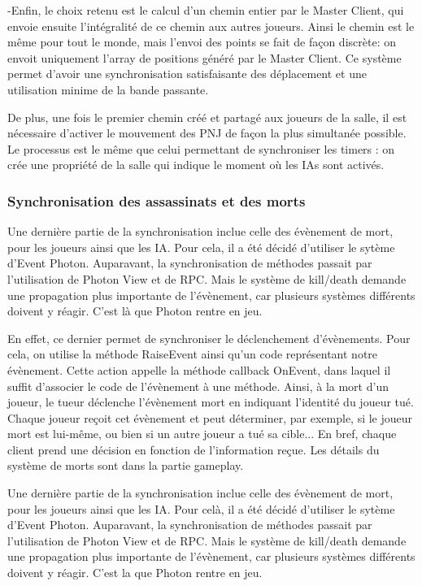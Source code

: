             -Enfin, le choix retenu est le calcul d'un chemin entier par le Master Client, qui envoie ensuite l'intégralité de ce chemin aux autres joueurs.
            Ainsi le chemin est le même pour tout le monde, mais l'envoi des points se fait de façon discrète: on envoit uniquement l'array de positions généré
            par le Master Client. Ce système permet d'avoir une synchronisation satisfaisante des déplacement et une utilisation minime de la bande passante.

        De plus, une fois le premier chemin créé et partagé aux joueurs de la salle, il est nécessaire d'activer le mouvement des PNJ de façon la plus simultanée possible.
        Le processus est le même que celui permettant de synchroniser les timers : on crée une propriété de la salle qui indique le moment où
        les IAs sont activés.

    \subsubsection{Synchronisation des assassinats et des morts}

        Une dernière partie de la synchronisation inclue celle des évènement de mort, pour les joueurs ainsi
        que les IA. Pour cela, il a été décidé d'utiliser le sytème d'Event Photon. Auparavant, la synchronisation de méthodes
        passait par l'utilisation de Photon View et de RPC. Mais le système de kill/death demande une propagation plus importante
        de l'évènement, car plusieurs systèmes différents doivent y réagir. C'est là que Photon rentre en jeu.

        En effet, ce dernier permet de synchroniser le déclenchement d'évènements. Pour cela, on utilise la méthode RaiseEvent ainsi
        qu'un code représentant notre évènement. Cette action appelle la méthode callback OnEvent, dans laquel il suffit d'associer le
        code de l'évènement à une méthode. Ainsi, à la mort d'un joueur, le tueur déclenche l'évènement mort en indiquant l'identité du
        joueur tué. Chaque joueur reçoit cet évènement et peut déterminer, par exemple, si le joueur mort est lui-même, ou bien si un
        autre joueur a tué sa cible... En bref, chaque client prend une décision en fonction de l'information reçue.
        Les détails du système de morts sont dans la partie gameplay.

        Une dernière partie de la synchronisation inclue celle des évènement de mort, pour les joueurs ainsi
        que les IA. Pour celà, il a été décidé d'utiliser le sytème d'Event Photon. Auparavant, la synchronisation de méthodes
        passait par l'utilisation de Photon View et de RPC. Mais le système de kill/death demande une propagation plus importante
        de l'évènement, car plusieurs systèmes différents doivent y réagir. C'est la que Photon rentre en jeu.

